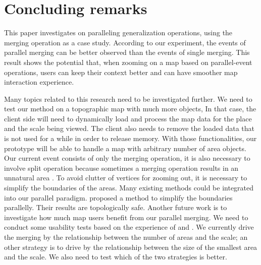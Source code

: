 \documentclass{ica}
\begin{document}
\section{Concluding remarks}
\label{sec:concluding_remarks}

This paper investigates on paralleling generalization operations,
using the merging operation as a case study. 
According to our experiment,
the events of parallel merging 
can be better observed than the events of single merging.
This result shows the potential that,
when zooming on a map based on parallel-event operations,
users can keep their context better 
and can have smoother map interaction experience.

Many topics related to this research need to be investigated further.
We need to test our method on a topographic map with much more objects,
In that case, the client side will need to dynamically load 
and process the map data 
for the place and the scale being viewed.
The client also needs to remove the loaded data that is not used for a while 
in order to release memory.
With those functionalities, our prototype will be able to handle 
a map with arbitrary number of area objects.
Our current event consists of only the merging operation,
it is also necessary to involve split operation
because sometimes a merging operation results in an unnatural area
\citep{Haunert2008Skeleton,Meijers2016Split}.
To avoid clutter of vertices for zooming out, 
it is necessary to simplify the boundaries of the areas.
Many existing methods could be integrated into our parallel paradigm.
\citet{Meijers2011LineSimp} proposed a method 
to simplify the boundaries parallelly. 
Their results are topologically safe. 
Another future work is to investigate 
how much map users benefit from our parallel merging.
We need to conduct some usability tests based on the experience of
\citet[]{Suba2017Thesis} and \citet{Midtbo2007}.
We currently drive the merging by the relationship 
between the number of areas and the scale;
an other strategy is to drive 
by the relationship between the size of the smallest area and the scale.
We also need to test which of the two strategies is better.
\end{document}
